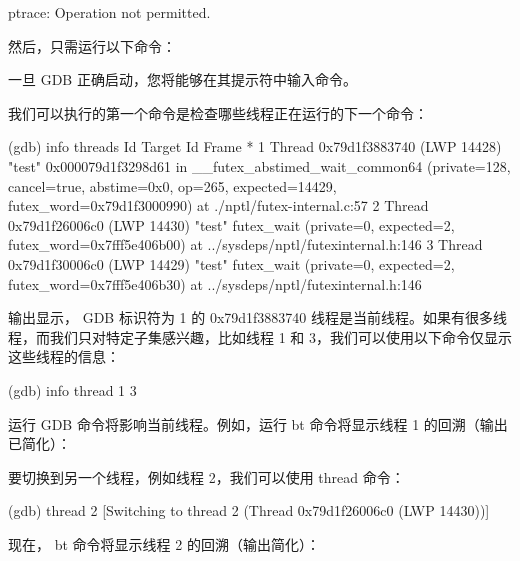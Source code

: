 \begin{shell}
ptrace: Operation not permitted.
\end{shell}

然后，只需运行以下命令：


一旦 GDB 正确启动，您将能够在其提示符中输入命令。

我们可以执行的第一个命令是检查哪些线程正在运行的下一个命令：

\begin{shell}
(gdb) info threads
Id Target Id Frame
* 1 Thread 0x79d1f3883740 (LWP 14428) "test" 0x000079d1f3298d61 in
__futex_abstimed_wait_common64 (private=128, cancel=true, abstime=0x0,
op=265, expected=14429, futex_word=0x79d1f3000990)
at ./nptl/futex-internal.c:57
2 Thread 0x79d1f26006c0 (LWP 14430) "test" futex_wait (private=0,
expected=2, futex_word=0x7fff5e406b00) at ../sysdeps/nptl/futexinternal.h:146
3 Thread 0x79d1f30006c0 (LWP 14429) "test" futex_wait (private=0,
expected=2, futex_word=0x7fff5e406b30) at ../sysdeps/nptl/futexinternal.h:146
\end{shell}

输出显示， GDB 标识符为 1 的 0x79d1f3883740 线程是当前线程。如果有很多线程，而我们只对特定子集感兴趣，比如线程 1 和 3，我们可以使用以下命令仅显示这些线程的信息：

\begin{shell}
(gdb) info thread 1 3
\end{shell}

运行 GDB 命令将影响当前线程。例如，运行 bt 命令将显示线程 1 的回溯（输出已简化）：


要切换到另一个线程，例如线程 2，我们可以使用 thread 命令：

\begin{shell}
(gdb) thread 2
[Switching to thread 2 (Thread 0x79d1f26006c0 (LWP 14430))]
\end{shell}

现在， bt 命令将显示线程 2 的回溯（输出简化）：

